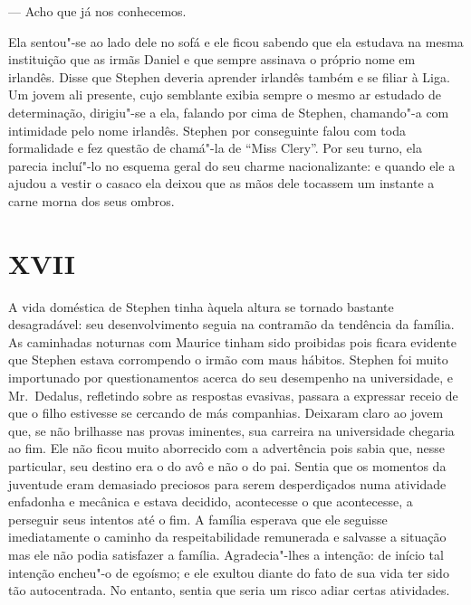 --- Acho que já nos conhecemos.

Ela sentou"-se ao lado dele no sofá e ele ficou sabendo que ela estudava
na mesma instituição que as irmãs Daniel e que sempre assinava o
próprio nome em irlandês.  Disse que Stephen deveria \label{aprender"-irlandes} aprender irlandês
também e se filiar à Liga.  Um jovem ali presente, cujo
semblante exibia sempre o mesmo ar estudado de determinação, dirigiu"-se
a ela, falando por cima de Stephen, chamando"-a com intimidade pelo nome
irlandês.  Stephen por conseguinte falou com toda formalidade e fez
questão de chamá"-la de “Miss Clery”.  Por seu turno, ela parecia
incluí"-lo no \label{esquema"-geral} esquema geral do seu charme nacionalizante: e quando ele
a ajudou a vestir o casaco ela deixou que as mãos dele tocassem um
instante a carne morna dos seus ombros.


\section*{XVII}

A vida doméstica de Stephen tinha àquela altura se tornado bastante
desagradável: seu desenvolvimento seguia na contramão da
tendência da família.  As caminhadas noturnas com Maurice tinham sido
proibidas pois ficara evidente que Stephen estava corrompendo o irmão
com maus hábitos.  Stephen foi muito importunado por questionamentos
acerca do seu desempenho na universidade, e Mr.~Dedalus, refletindo
sobre as respostas evasivas, passara a expressar receio de que o filho
estivesse se cercando de más companhias.  Deixaram claro ao jovem
que, se não brilhasse nas provas iminentes, sua carreira na
universidade chegaria ao fim.  Ele não ficou muito aborrecido com a
advertência pois sabia que, nesse particular, seu destino era o do avô
e não o do pai.  Sentia que os momentos da juventude eram demasiado
preciosos para serem desperdiçados numa atividade enfadonha e mecânica
e estava decidido, acontecesse o que acontecesse, a perseguir seus
intentos até o fim.  A família esperava que ele seguisse imediatamente
o caminho da respeitabilidade remunerada e salvasse a situação mas ele
não podia satisfazer a família.  Agradecia"-lhes a intenção: de início
tal intenção encheu"-o de egoísmo; e ele exultou diante do fato de sua
vida ter sido tão autocentrada.  No entanto, sentia que \label{seria"-um} seria
um risco adiar certas atividades.

